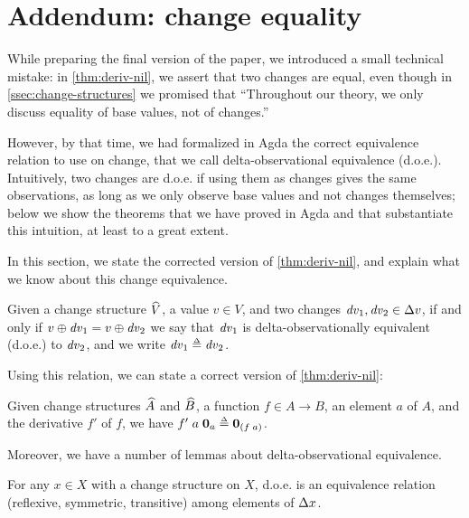 \section{Addendum: change equality}
\label{sec:change-eq}

While preparing the final version of the paper, we introduced a
small technical mistake: in \cref{thm:deriv-nil}, we assert that
two changes are equal, even though in
\cref{ssec:change-structures} we promised that ``Throughout
our theory, we only discuss equality of base values, not of
changes.''

However, by that time, we had formalized in Agda the correct
equivalence relation to use on change, that we call
delta-observational equivalence (d.o.e.). Intuitively, two
changes are d.o.e. if using them as changes gives the same
observations, as long as we only observe base values and not
changes themselves; below we show the theorems that we have
proved in Agda and that substantiate this intuition, at least to
a great extent.

In this section, we
state the corrected version of \cref{thm:deriv-nil}, and explain
what we know about this change equivalence.

\begin{definition}
  Given a change structure $\widehat{V}$, a value $v \in V$,
  and two changes $\D v_1, \D v_2 \in \Change{v}$, if and only if
  $\Update{v}{\D v_1} = \Update{v}{\D v_2}$ we say that $\mathit{dv}_1$
  is delta-observationally equivalent (d.o.e.) to $\mathit{dv}_2$, and
  we write $\D v_1 \Doe \D v_2$.
\end{definition}

Using this relation, we can state a correct version of
\cref{thm:deriv-nil}:

\begin{lemma}
  \label{thm:deriv-nil-2}
  Given change structures $\widehat{A}$ and
  $\widehat{B}$, a function $f \in A \to B$, an element $a$
  of $A$, and the derivative $f'$ of $f$, we have
  $\App{\App{f'}{a}}{\Nil{a}} \Doe \Nil{\App* f a}$.
\end{lemma}

Moreover, we have a number of lemmas about delta-observational
equivalence.


\begin{lemma}[D.o.e. is an equivalence]
  For any $x \in X$ with a change structure on $X$, d.o.e. is an
  equivalence relation (reflexive, symmetric, transitive) among
  elements of $\Change{x}$.
\end{lemma}

